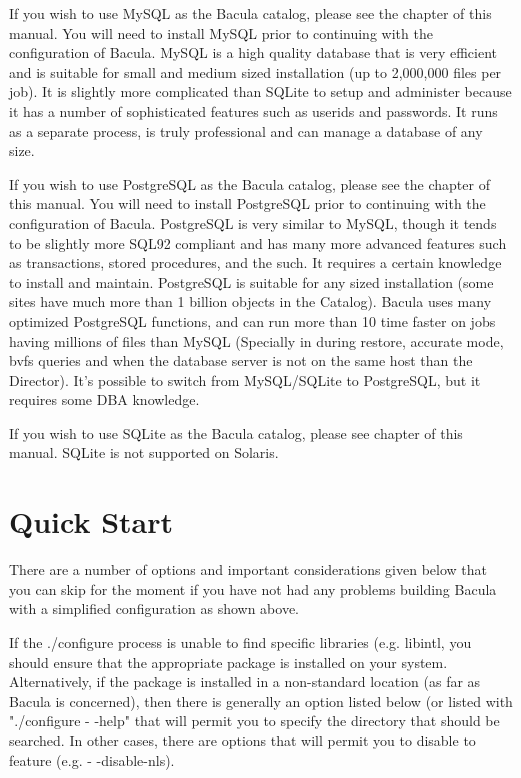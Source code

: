 If you wish to use MySQL as the Bacula catalog, please see the
 chapter of this
manual. You will need to install MySQL prior to continuing with the
configuration of Bacula. MySQL is a high quality database that is very
efficient and is suitable for small and medium sized installation (up to
2,000,000 files per job). It is slightly more complicated than SQLite to setup
and administer because it has a number of sophisticated features such as
userids and passwords. It runs as a separate process, is truly professional and
can manage a database of any size.

If you wish to use PostgreSQL as the Bacula catalog, please see the
 chapter of
this manual. You will need to install PostgreSQL prior to continuing with the
configuration of Bacula. PostgreSQL is very similar to MySQL, though it tends
to be slightly more SQL92 compliant and has many more advanced features such as
transactions, stored procedures, and the such. It requires a certain knowledge
to install and maintain. PostgreSQL is suitable for any sized installation
(some sites have much more than 1 billion objects in the Catalog). Bacula uses
many optimized PostgreSQL functions, and can run more than 10 time faster on
jobs having millions of files than MySQL (Specially in during restore, accurate
mode, bvfs queries and when the database server is not on the same host than
the Director). It's possible to switch from MySQL/SQLite to PostgreSQL, but it
requires some DBA knowledge.

If you wish to use SQLite as the Bacula catalog, please see 
 chapter of
this manual. SQLite is not supported on Solaris.

\section{Quick Start}

There are a number of options and important considerations given below
that you can skip for the moment if you have not had any problems building
Bacula with a simplified configuration as shown above. 
      
If the ./configure process is unable to find specific libraries (e.g.    
libintl, you should ensure that the appropriate package is installed on
your system. Alternatively, if the package is installed in a non-standard
location (as far as Bacula is concerned), then there is generally an
option listed below (or listed with "./configure {-} {-}help" that will
permit you to specify the directory that should be searched. In other
cases, there are options that will permit you to disable to feature 
(e.g. {-} {-}disable-nls).

